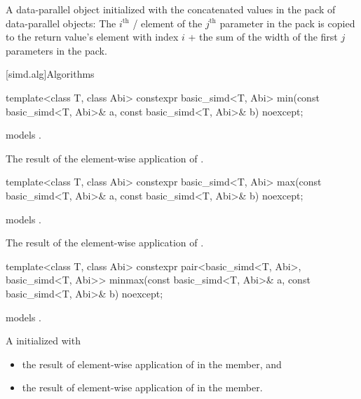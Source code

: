 \begin{itemdescr}
  \pnum\returns
  A data-parallel object initialized with the concatenated values in the  pack of data-parallel objects: The $i^\text{th}$ / element of the $j^\text{th}$ parameter in the  pack is copied to the return value's element with index $i$ + the sum of the width of the first $j$ parameters in the  pack.
\end{itemdescr}

[simd.alg]{Algorithms}

\begin{itemdecl}
template<class T, class Abi>
  constexpr basic_simd<T, Abi> min(const basic_simd<T, Abi>& a, const basic_simd<T, Abi>& b) noexcept;
\end{itemdecl}

\begin{itemdescr}
  \pnum\constraints
   models .

  \pnum\returns
  The result of the element-wise application of  \foralli.
\end{itemdescr}

\begin{itemdecl}
template<class T, class Abi>
  constexpr basic_simd<T, Abi> max(const basic_simd<T, Abi>& a, const basic_simd<T, Abi>& b) noexcept;
\end{itemdecl}

\begin{itemdescr}
  \pnum\constraints
   models .

  \pnum\returns
  The result of the element-wise application of  \foralli.
\end{itemdescr}

\begin{itemdecl}
template<class T, class Abi>
  constexpr pair<basic_simd<T, Abi>, basic_simd<T, Abi>>
  minmax(const basic_simd<T, Abi>& a, const basic_simd<T, Abi>& b) noexcept;
\end{itemdecl}

\begin{itemdescr}
  \pnum\constraints
   models .

  \pnum\returns
  A  initialized with
  \begin{itemize}
    \item the result of element-wise application of  \foralli{} in the  member, and
    \item the result of element-wise application of  \foralli{} in the  member.
  \end{itemize}
\end{itemdescr}

